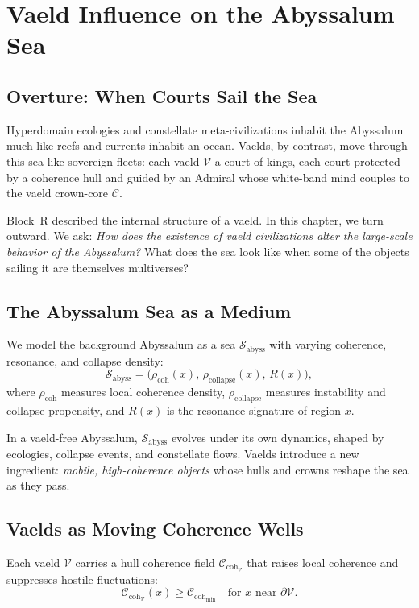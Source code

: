 
\chapter{Vaeld Influence on the Abyssalum Sea}
\label{ch:vaeld-influence}

\newcommand{\vaeld}{\mathcal{V}}
\newcommand{\core}{\mathcal{C}}
\newcommand{\universe}{\mathcal{U}}
\newcommand{\CoField}{\mathcal{C}_{\mathrm{coh}}}
\newcommand{\ConGraph}{\mathcal{G}_{\mathrm{const}}}
\newcommand{\Sea}{\mathcal{S}_{\mathrm{abyss}}}

\section*{Overture: When Courts Sail the Sea}
Hyperdomain ecologies and constellate meta-civilizations inhabit the Abyssalum much like reefs and
currents inhabit an ocean. Vaelds, by contrast, move through this sea like sovereign fleets: each
vaeld $\vaeld$ a court of kings, each court protected by a coherence hull and guided by an Admiral
whose white-band mind couples to the vaeld crown-core $\core$.

Block~R described the internal structure of a vaeld. In this chapter, we turn outward. We ask:
\emph{How does the existence of vaeld civilizations alter the large-scale behavior of the
Abyssalum?} What does the sea look like when some of the objects sailing it are themselves
multiverses?

\section{The Abyssalum Sea as a Medium}
We model the background Abyssalum as a sea $\Sea$ with varying coherence, resonance, and collapse
density:
\[
\Sea = \big( \rho_{\mathrm{coh}}(x),\, \rho_{\mathrm{collapse}}(x),\, R(x) \big),
\]
where $\rho_{\mathrm{coh}}$ measures local coherence density, $\rho_{\mathrm{collapse}}$ measures
instability and collapse propensity, and $R(x)$ is the resonance signature of region $x$.

In a vaeld-free Abyssalum, $\Sea$ evolves under its own dynamics, shaped by ecologies, collapse
events, and constellate flows. Vaelds introduce a new ingredient: \emph{mobile, high-coherence
objects} whose hulls and crowns reshape the sea as they pass.

\section{Vaelds as Moving Coherence Wells}
Each vaeld $\vaeld$ carries a hull coherence field $\CoField_{\vaeld}$ that raises local coherence
and suppresses hostile fluctuations:
\[
\CoField_{\vaeld}(x) \ge \CoField_{\mathrm{min}} \quad \text{for } x \text{ near } \partial\vaeld.
\]

